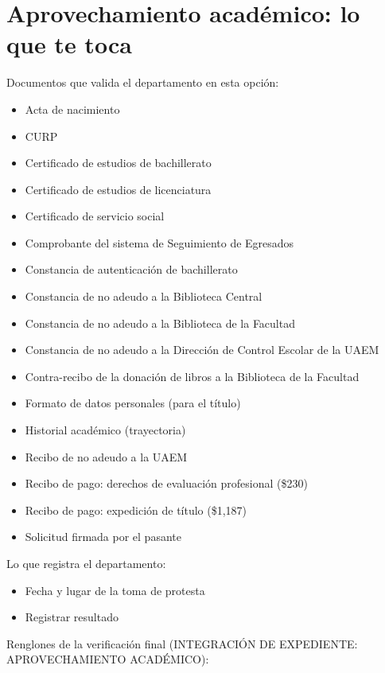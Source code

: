\section{Aprovechamiento académico: lo que te toca}
Documentos que valida el departamento en esta opción:
\begin{itemize}
  \item Acta de nacimiento
  \item CURP
  \item Certificado de estudios de bachillerato
  \item Certificado de estudios de licenciatura
  \item Certificado de servicio social
  \item Comprobante del sistema de Seguimiento de Egresados
  \item Constancia de autenticación de bachillerato
  \item Constancia de no adeudo a la Biblioteca Central
  \item Constancia de no adeudo a la Biblioteca de la Facultad
  \item Constancia de no adeudo a la Dirección de Control Escolar de la UAEM
  \item Contra-recibo de la donación de libros a la Biblioteca de la Facultad
  \item Formato de datos personales (para el título)
  \item Historial académico (trayectoria)
  \item Recibo de no adeudo a la UAEM
  \item Recibo de pago: derechos de evaluación profesional (\$230)
  \item Recibo de pago: expedición de título (\$1,187)
  \item Solicitud firmada por el pasante
\end{itemize}
Lo que registra el departamento:
\begin{itemize}
  \item Fecha y lugar de la toma de protesta
  \item Registrar resultado
\end{itemize}
Renglones de la verificación final (INTEGRACIÓN DE EXPEDIENTE: APROVECHAMIENTO ACADÉMICO):
